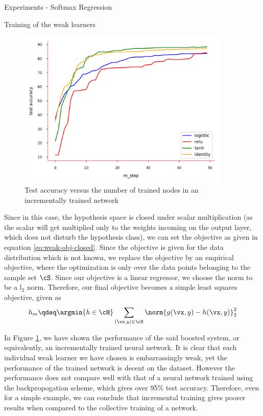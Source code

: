 \documentclass{article}
\begin{document}
\begin{psection}{Experiments - Softmax Regression}
\begin{psubsection}{Training of the weak learners}
		\begin{figure}[h!]
			\centering
			\includegraphics[width=0.9\textwidth]{includes/boosting-comparison-plot.png}
			\caption{Test accuracy versus the number of trained nodes in an incrementally trained network}
			\label{fig:boosting-comp-plot}
		\end{figure}

		Since in this case, the hypothesis space is closed under scalar multiplication (as the scalar will get multiplied only to the weights incoming on the output layer, which does not disturb the hypothesis class), we can set the objective as given in equation \ref{eq:weak-obj-closed}. Since the objective is given for the data distribution which is not known, we replace the objective by an empirical objective, where the optimization is only over the data points belonging to the sample set $\cS$. Since our objective is a linear regressor, we choose the norm to be a l$_2$ norm. Therefore, our final objective becomes a simple least squares objective, given as
		\begin{align*}
			h_m \qdeq \argmin{h \in \cH} \sum_{(\vx, y) \in \cS} \norm{g(\vx, y) - h(\vx, y)}_2^2
		\end{align*}

		In Figure \ref{fig:boosting-comp-plot}, we have shown the performance of the said boosted system, or equivalently, an incrementally trained neural network. It is clear that each individual weak learner we have chosen is embarrassingly weak, yet the performance of the trained network is decent on the dataset. However the performance does not compare well with that of a neural network trained using the backpropogation scheme, which gives over 95\% test accuracy. Therefore, even for a simple example, we can conclude that incremental training gives poorer results when compared to the collective training of a network.


\end{psubsection}
\end{psection}
\end{document}
